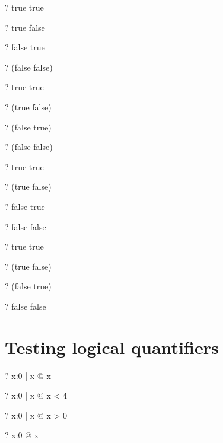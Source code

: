 \documentclass{article}
\begin{document}
\begin{zed} \vdash?  true \lor true \end{zed}
\begin{zed} \vdash?  true \lor false \end{zed}
\begin{zed} \vdash?  false \lor true \end{zed}
\begin{zed} \vdash?  \lnot(false \lor false) \end{zed}

\begin{zed} \vdash?  true \land true \end{zed}
\begin{zed} \vdash?  \lnot(true \land false) \end{zed}
\begin{zed} \vdash?  \lnot(false \land true) \end{zed}
\begin{zed} \vdash?  \lnot(false \land false) \end{zed}

\begin{zed} \vdash?  true \implies true \end{zed}
\begin{zed} \vdash?  \lnot(true \implies false) \end{zed}
\begin{zed} \vdash?  false \implies true \end{zed}
\begin{zed} \vdash?  false \implies false \end{zed}

\begin{zed} \vdash?  true \iff true \end{zed}
\begin{zed} \vdash?  \lnot(true \iff false) \end{zed}
\begin{zed} \vdash?  \lnot(false \iff true) \end{zed}
\begin{zed} \vdash?  false \iff false \end{zed}


\section{Testing logical quantifiers}
\begin{zed} \vdash? \forall x:0  | x  @ x   \end{zed}
\begin{zed} \vdash?  \lnot \forall x:0  | x  @ x < 4 \end{zed}
\begin{zed} \vdash?  \lnot \forall x:0  | x  @ x > 0 \end{zed}
\begin{zed} \vdash?  \lnot \forall x:0  @ x  \end{zed}
\end{document}
